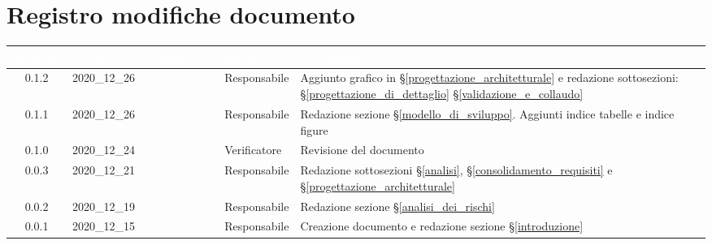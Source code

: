 \section*{Registro modifiche documento}
{

     
\renewcommand{\arraystretch}{1.5}
\centering
\begin{longtable}{ c c  C{2.3cm} C{3cm} C{3.2cm}}


 \textcolor{white}{\textbf{Versione}}&
    \textcolor{white}{\textbf{Data}}&
    \textcolor{white}{\textbf{Nominativo}}&
    \textcolor{white}{\textbf{Ruolo}}&
    \textcolor{white}{\textbf{Descrizione}}\\	
    \endhead

    0.1.2 & 2020\_12\_26 & \MM{} & Responsabile & Aggiunto grafico in \S\ref{progettazione_architetturale} e redazione sottosezioni:  \S\ref{progettazione_di_dettaglio} \S\ref{validazione_e_collaudo} \\

    0.1.1 & 2020\_12\_26 & \MM{} & Responsabile & Redazione sezione \S\ref{modello_di_sviluppo}. Aggiunti indice tabelle e indice figure \\

    0.1.0 & 2020\_12\_24 & \PC{} & Verificatore & Revisione del documento\\

    0.0.3 & 2020\_12\_21 & \MM{} & Responsabile & Redazione sottosezioni \S\ref{analisi}, \S\ref{consolidamento_requisiti} e \S\ref{progettazione_architetturale} \\

    0.0.2 & 2020\_12\_19 & \MM{} & Responsabile & Redazione sezione \S\ref{analisi_dei_rischi}\\

    0.0.1 & 2020\_12\_15 & \MM{} & Responsabile & Creazione documento e redazione sezione \S\ref{introduzione}
			
\end{longtable}
}
